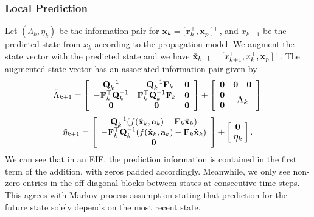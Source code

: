 \subsubsection{Local Prediction}
Let $(\Lambda_k,\eta_k)$ be the information pair for ${\bf x}_k=[{x}_{k}^\top,{\bf x}_p^\top]^\top$, and $x_{k+1}$ be the predicted state from $x_k$ according to the propagation model. We augment the state vector with the predicted state and we have ${\tilde{\bf x}}_{k+1}=[{x}_{k+1}^\top,{x}_k^\top,{\bf x}_p^\top]^\top$. The augmented state vector has an associated information pair given by
     \[
\sbox0{$\begin{matrix}{\bf 0} & {\bf 0}\end{matrix}$}
\sbox1{$\begin{matrix}{\bf 0}\\ {\bf 0}\end{matrix}$}
%
{\tilde\Lambda}_{k+1}=\left[
                    \begin{array}{ccc}
                      {\bf Q}_k^{-1} & -{\bf Q}_k^{-1}{\bf F}_k & {\bf 0} \\
                      -{\bf F}_k^\top{\bf Q}_k^{-1} & {\bf F}_k^\top{\bf Q}_k^{-1}{\bf F}_k & {\bf 0} \\
                      {\bf 0} & {\bf 0} & {\bf 0} \\
                    \end{array}
                  \right]+\left[
\begin{array}{cc}
{\bf 0} &\usebox{0}\\
  \usebox{1}&\makebox[\wd0]{\large $\Lambda_{k}$}
\end{array}
\right] \\
\]
\[
\tilde\eta_{k+1}=\left[
                                    \begin{array}{c}
                                      {\bf Q}_k^{-1}(f({\bf\hat x}_k,{\bf a}_k)-{\bf F}_k{\bf\hat x}_k) \\
                                      -{\bf F}_k^\top{\bf Q}_k^{-1}(f({\bf\hat x}_k,{\bf a}_k)-{\bf F}_k{\bf\hat x}_k) \\
                                      {\bf 0} \\
                                    \end{array}
                                  \right]+\left[
\begin{array}{c}
{\bf 0}\\
 \makebox[\wd0]{\large $\eta_{k}$}
\end{array}
\right].
\]
We can see that in an EIF, the prediction information is contained in the first term of the addition, with zeros padded accordingly. Meanwhile, we only see non-zero entries in the off-diagonal blocks between states at consecutive time steps. This agrees with Markov process assumption stating that prediction for the future state solely depends on the most recent state.

